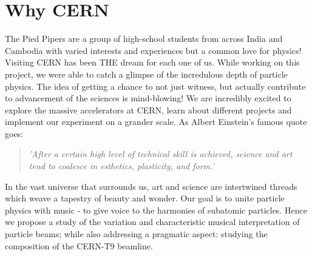 \section{\textbf{Why CERN}}

\hspace{5mm}The Pied Pipers are a group of high-school students from across India and Cambodia with varied interests and experiences but a common love for physics! \\
Visiting CERN has been THE dream for each one of us. While working on this project, we were able to catch a glimpse of the incredulous depth of particle physics. The idea of getting a chance to not just witness, but actually contribute to advancement of the sciences is mind-blowing! We are incredibly excited to explore the massive accelerators at CERN, learn about different projects and implement our experiment on a grander scale. As Albert Einstein's famous quote goes: 

\begin{quote}
    \begin{center}
    \textit{'After a certain high level of technical skill is achieved, science and art tend to coalesce in esthetics, plasticity, and form.'}
    \end{center}
\end{quote}
\hspace{5mm}In the vast universe that surrounds us, art and science are intertwined threads which weave a tapestry of beauty and wonder. Our goal is to unite particle physics with music - to give voice to the harmonies of subatomic particles. Hence we propose a study of the variation and characteristic musical interpretation of particle beams; while also addressing a pragmatic aspect: studying the composition of the CERN-T9 beamline.